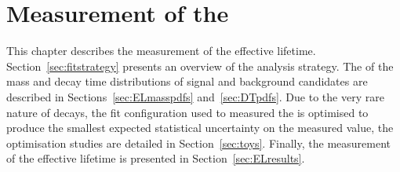 \chapter{{\bf Measurement of the }}
\label{sec:lifetimemeasurement}

This chapter describes the measurement of the \bsmumu effective lifetime. %
Section~\ref{sec:fitstrategy} presents an overview of the analysis strategy. %
The \pdfs of the mass and decay time distributions of signal and background candidates are described in Sections~\ref{sec:ELmasspdfs} and~\ref{sec:DTpdfs}. Due to the very rare nature of \bsmumu decays, the fit configuration used to measured the \el is optimised to produce the smallest expected statistical uncertainty on the measured value, the optimisation studies are detailed in Section~\ref{sec:toys}. Finally, the measurement of the \bsmumu effective lifetime is presented in Section~\ref{sec:ELresults}.







